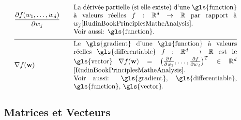 \newpage
\begin{align}
	&  \frac{\partial f(\weight_{1},\ldots,\weight_{\nrfeatures})}{\partial \weight_{\featureidx}} & \quad & \parbox{.70\textwidth}{La dérivée partielle (si elle existe)
		d'une \gls{function} à valeurs réelles $f: \mathbb{R}^{\featuredim}\rightarrow \mathbb{R}$ par rapport à\ $\weight_{\featureidx}$\cite[Ch. 9]{RudinBookPrinciplesMatheAnalysis}.
		\\ Voir aussi: \gls{function}.} \nonumber \\[2mm] \hline \nonumber\\[-5mm]
	&\nabla f(\weights) & \quad & \parbox{.70\textwidth}{Le \gls{gradient} d'une \gls{function} à valeurs réelles \gls{differentiable} 
		$f: \mathbb{R}^{\featuredim}\rightarrow \mathbb{R}$ est le \gls{vector}
		$\nabla f(\weights) = \big( \frac{\partial f}{\partial \weight_{1}},\ldots,\frac{\partial f}{\partial \weight_{\featuredim}}  \big)^{T} \in \mathbb{R}^{\featuredim}$ \cite[Ch. 9]{RudinBookPrinciplesMatheAnalysis}.
		\\ Voir aussi: \gls{gradient}, \gls{differentiable}, \gls{function}, \gls{vector}.} \nonumber
\end{align} 


\subsection*{Matrices et Vecteurs} 

